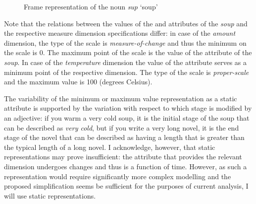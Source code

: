 \begin{figure}
\centering
{}
\caption{Frame representation of the noun \textit{sup} `soup' \label{frame:soup:dic}}
\end{figure}

Note that the relations between the values of the \AMOUNT and \TEMP attributes of the \textit{soup} and the respective measure dimension specifications differ:  in case of the \textit{amount} dimension, the type of the scale is \textit{measure-of-change} and thus the minimum on the scale is 0. The maximum point of the scale is the value of the \AMOUNT attribute of the \textit{soup}. In case of the \textit{temperature} dimension the value of the \TEMP attribute serves as a minimum point of the respective dimension. The type of the scale is \textit{proper-scale} and the maximum value is 100 (degrees Celsius).

The variability of the minimum or maximum value representation as a static attribute is supported by the variation with respect to which stage is modified by an adjective: if you warm a very cold soup, it is the initial stage of the soup that can be described as \textit{very cold}, but if you write a very long novel, it is the end stage of the novel that can be described as having a length that is greater than the typical length of a long novel. I acknowledge, however, that static representations may prove insufficient: the attribute that provides the relevant dimension undergoes changes and thus is a function of time. However, as such a representation would require significantly more complex modelling and the proposed simplification seems be sufficient for the purposes of current analysis, I will use static representations.

